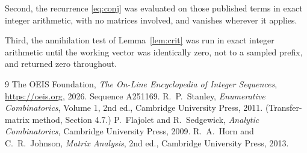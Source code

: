 \documentclass[11pt,a4paper]{article}
\theoremstyle{plain}
\theoremstyle{definition}
\begin{document}
Second, the recurrence \eqref{eq:conj} was evaluated on those published terms in exact
integer arithmetic, with no matrices involved, and vanishes wherever it applies.

Third, the annihilation test of Lemma~\ref{lem:crit} was run in exact integer arithmetic
until the working vector was identically zero, not to a sampled prefix, and returned zero
throughout.

\begin{thebibliography}{9}
 The OEIS Foundation, \emph{The On-Line Encyclopedia of Integer
Sequences}, \url{https://oeis.org}, 2026. Sequence A251169.
 R.~P.~Stanley, \emph{Enumerative Combinatorics}, Volume 1, 2nd ed.,
Cambridge University Press, 2011. (Transfer-matrix method, Section 4.7.)
 P.~Flajolet and R.~Sedgewick, \emph{Analytic Combinatorics}, Cambridge
University Press, 2009.
 R.~A.~Horn and C.~R.~Johnson, \emph{Matrix Analysis}, 2nd ed., Cambridge
University Press, 2013.
\end{thebibliography}
\end{document}
